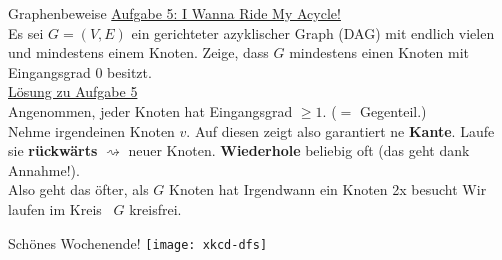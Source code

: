 \begin{frame}{Graphenbeweise}
	\underline{Aufgabe 5: I Wanna Ride My Acycle!} \\
	Es sei $G = (V, E)$ ein gerichteter azyklischer Graph (DAG) mit endlich vielen und mindestens einem Knoten. Zeige, dass $G$ mindestens einen Knoten mit Eingangsgrad 0 besitzt. \\
	\pause
	\forcenewline
	\underline{Lösung zu Aufgabe 5} \\
	Angenommen, jeder Knoten hat Eingangsgrad $\geq 1$. ($=$ Gegenteil.) \\ 
	Nehme irgendeinen Knoten $v$. Auf diesen zeigt also garantiert ne \textbf{Kante}. Laufe sie \textbf{rückwärts} $\rightsquigarrow$ neuer Knoten. \textbf{Wiederhole} beliebig oft (das geht dank Annahme!). \\
	Also geht das öfter, als $G$ Knoten hat \impl Irgendwann ein Knoten 2x besucht \impl Wir laufen im Kreis \impl \lightning\ $G$ kreisfrei. 
\end{frame}

\begin{frame}{Schönes Wochenende! \smiley}
	\centering
	\texttt{[image: xkcd-dfs]}
\end{frame}


